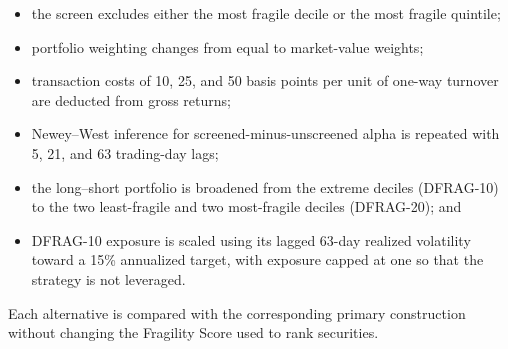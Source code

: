 \begin{itemize}
    \item the screen excludes either the most fragile decile or the most fragile quintile;
    \item portfolio weighting changes from equal to market-value weights;
    \item transaction costs of 10, 25, and 50 basis points per unit of one-way turnover are deducted from gross returns;
    \item Newey--West inference for screened-minus-unscreened alpha is repeated with 5, 21, and 63 trading-day lags;
    \item the long--short portfolio is broadened from the extreme deciles (DFRAG-10) to the two least-fragile and two most-fragile deciles (DFRAG-20); and
    \item DFRAG-10 exposure is scaled using its lagged 63-day realized volatility toward a 15\% annualized target, with exposure capped at one so that the strategy is not leveraged.
\end{itemize}

\noindent
Each alternative is compared with the corresponding primary construction without changing the Fragility Score used to rank securities.
